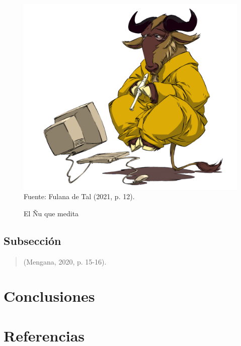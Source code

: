 \documentclass[12pt,letterpaper,oneside]{article}
\begin{document}
\begin{figure}[ht]
	\caption{El Ñu que medita}
	\includegraphics[scale=.35]{linuximagen}\\ %
	\footnotesize \center Fuente: Fulana de Tal (2021, p. 12).
	
\end{figure}

\subsection*{Subsección}

\noindent \lipsum[1-2]

\begin{quotation}
	\lipsum[1-2] (Mengana, 2020, p. 15-16).
\end{quotation}

\section*{Conclusiones}

\noindent \lipsum[1]

\section*{Referencias}
\end{document}
